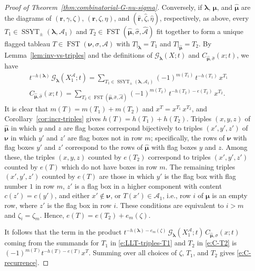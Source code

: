 \documentclass[12pt]{amsart}
\theoremstyle{definition}
\theoremstyle{remark}
\newcommand{\rr}{{\mathbf r}}
\newcommand{\lambold}{{\boldsymbol \lambda }}
\newcommand{\mubold}{{\boldsymbol \mu}}
\newcommand{\nubold}{{\boldsymbol \nu }}
\newcommand{\Acal}{{\mathcal A}}
\newcommand{\Gcal}{{\mathcal G}}
\newcommand{\sigmahat}{\widehat{\sigma }}
\newcommand{\rrhat}{\widehat{\rr }}
\newcommand{\etahat}{\widehat{\eta }}
\newcommand{\zetahat}{\widehat{\zeta }}
\newcommand{\muboldhat}{\widehat{\mubold }}
\newcommand{\Acalhat}{\widehat{\Acal  }}
\DeclareMathOperator{\SSYT}{SSYT}
\DeclareMathOperator{\FSST}{FST}
\begin{document}
\begin{proof}[Proof of Theorem~\ref{thm:combinatorial-G-nu-sigma}]
Conversely, if $\lambold $, $\mubold $, and $\muboldhat $ are the
diagrams of $(\rr ,\gamma ,\zeta )$, $(\rr ,\zeta ,\eta )$, and
$(\rrhat ,\zetahat, \etahat )$, respectively, as above, every
$T_{1}\in \SSYT _{\pm }(\lambold ,\Acal _{1})$ and $T_{2} \in \FSST
(\muboldhat , \sigmahat ,\Acalhat )$ fit together to form a unique
flagged tableau $T\in \FSST (\nubold ,\sigma ,\Acal )$ with
$T|_{\lambold } = T_{1}$ and $T|_{\muboldhat } = T_{2}$.  By
Lemma~\ref{lem:inv-vs-triples} and the definitions of $\Gcal
_{\lambold }(X;t)$ and $C_{\muboldhat ,\sigmahat }(x;t)$, we have
\begin{gather}\label{e:LLT-triples-T1}
t^{-h(\lambold )}\, \Gcal _{\lambold }(X^\Acal_{1}; t) = \sum _{T_{1}\in
\SSYT _{\pm }(\lambold ,\Acal _{1})} (-1)^{m(T_{1})}\, t^{-h(T_{1})}\,
x^{T_{1}}\\
\label{e:C-T2} C_{\muboldhat ,\sigmahat }(x;t) = \sum _{T_{2} \in
\FSST (\muboldhat , \sigmahat ,\Acalhat )} (-1)^{m(T_{2})}\,
t^{-h(T_{2})-e(T_{2})}\, x^{T_{2}}.
\end{gather}
It is clear that $m(T) = m(T_{1})+m(T_{2})$ and $x^{T} = x^{T_{1}}\,
x^{T_{2}}$, and Corollary~\ref{cor:incr-triples} gives
$h(T)=h(T_{1})+h(T_{2})$.  Triples $(x,y,z)$ of $\muboldhat $ in which
$y$ and $z$ are flag boxes correspond bijectively to triples
$(x',y',z')$ of $\nubold $ in which $y'$ and $z'$ are flag boxes not
in row $m$; specifically, the rows of $\nubold $ with flag boxes $y'$
and $z'$ correspond to the rows of $\muboldhat $ with flag boxes $y$
and $z$.  Among these, the triples $(x,y,z)$ counted by $e(T_{2})$
correspond to triples $(x',y',z')$ counted by $e(T)$ which do not have
boxes in row $m$.  The remaining triples $(x',y',z')$ counted by
$e(T)$ are those in which $y'$ is the flag box with flag number $1$ in
row $m$, $z'$ is a flag box in a higher component with content $c(z')
= c(y')$, and either $x'\not \in \nubold $, or $T(x')\in \Acal _{1}$,
i.e., row $i$ of $\mubold $ is an empty row, where $z'$ is the flag
box in row $i$.  These conditions are equivalent to $i>m$ and $\zeta
_{i} = \zeta _{m}$.  Hence, $e(T) = e(T_{2})+e_{m}(\zeta )$.

It follows that the term in the product $t^{-h(\lambold )-e_{m}(\zeta
)}\, \Gcal _{\lambold }(X^\Acal_{1}; t)\, C_{\muboldhat ,\sigmahat
}(x;t)$ coming from the summands for $T_{1}$ in
\eqref{e:LLT-triples-T1} and $T_{2}$ in \eqref{e:C-T2} is $(-1)^{m(T)}
t^{-h(T)-e(T)} x^{T}$.  Summing over all choices of $\zeta $, $T_{1}$,
and $T_{2}$ gives \eqref{e:C-recurrence}.
\end{proof}
\end{document}
